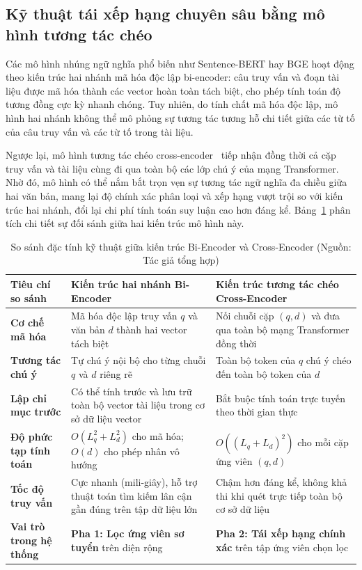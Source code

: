 \subsection{Kỹ thuật tái xếp hạng chuyên sâu bằng mô hình tương tác chéo}
Các mô hình nhúng ngữ nghĩa phổ biến như Sentence-BERT hay BGE hoạt động theo kiến trúc hai nhánh mã hóa độc lập bi-encoder: câu truy vấn và đoạn tài liệu được mã hóa thành các vector hoàn toàn tách biệt, cho phép tính toán độ tương đồng cực kỳ nhanh chóng. Tuy nhiên, do tính chất mã hóa độc lập, mô hình hai nhánh không thể mô phỏng sự tương tác tương hỗ chi tiết giữa các từ tố của câu truy vấn và các từ tố trong tài liệu.

Ngược lại, mô hình tương tác chéo cross-encoder~\cite{nogueira2019passage} tiếp nhận đồng thời cả cặp truy vấn và tài liệu cùng đi qua toàn bộ các lớp chú ý của mạng Transformer. Nhờ đó, mô hình có thể nắm bắt trọn vẹn sự tương tác ngữ nghĩa đa chiều giữa hai văn bản, mang lại độ chính xác phân loại và xếp hạng vượt trội so với kiến trúc hai nhánh, đổi lại chi phí tính toán suy luận cao hơn đáng kể. Bảng~\ref{tab:bi_vs_cross} phân tích chi tiết sự đối sánh giữa hai kiến trúc mô hình này.

\begin{table}[H]
\centering
\caption{So sánh đặc tính kỹ thuật giữa kiến trúc Bi-Encoder và Cross-Encoder (Nguồn: Tác giả tổng hợp)}
\label{tab:bi_vs_cross}
\small
\begin{tabularx}{\textwidth}{>{\raggedright\arraybackslash\bfseries}p{3.0cm} >{\raggedright\arraybackslash}X >{\raggedright\arraybackslash}X}
\toprule
\textbf{Tiêu chí so sánh} & \textbf{Kiến trúc hai nhánh Bi-Encoder} & \textbf{Kiến trúc tương tác chéo Cross-Encoder} \\
\midrule
Cơ chế mã hóa & Mã hóa độc lập truy vấn $q$ và văn bản $d$ thành hai vector tách biệt & Nối chuỗi cặp $(q, d)$ và đưa qua toàn bộ mạng Transformer đồng thời \\
Tương tác chú ý & Tự chú ý nội bộ cho từng chuỗi $q$ và $d$ riêng rẽ & Toàn bộ token của $q$ chú ý chéo đến toàn bộ token của $d$ \\
Lập chỉ mục trước & Có thể tính trước và lưu trữ toàn bộ vector tài liệu trong cơ sở dữ liệu vector & Bắt buộc tính toán trực tuyến theo thời gian thực \\
Độ phức tạp tính toán & $O(L_q^2 + L_d^2)$ cho mã hóa; $O(d)$ cho phép nhân vô hướng & $O((L_q + L_d)^2)$ cho mỗi cặp ứng viên $(q, d)$ \\
Tốc độ truy vấn & Cực nhanh (mili-giây), hỗ trợ thuật toán tìm kiếm lân cận gần đúng trên tập dữ liệu lớn & Chậm hơn đáng kể, không khả thi khi quét trực tiếp toàn bộ cơ sở dữ liệu \\
Vai trò trong hệ thống & \textbf{Pha 1: Lọc ứng viên sơ tuyển} trên diện rộng & \textbf{Pha 2: Tái xếp hạng chính xác} trên tập ứng viên chọn lọc \\
\bottomrule
\end{tabularx}
\end{table}

